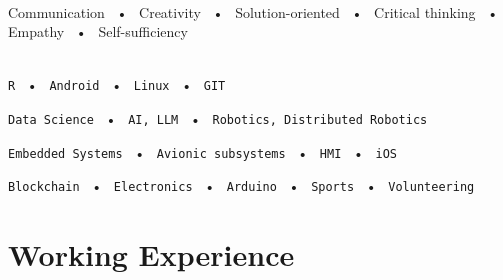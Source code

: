 \documentclass[lighthipster]{simplehipstercv}
\begin{document}
\begin{paracol}{2}
{    \bigskip
    
    \bigskip
    
    \\[0.5em]
    Communication ~•~ Creativity ~•~ Solution-oriented ~•~ Critical thinking ~•~ Empathy ~•~ Self-sufficiency

    \bigskip
    
    \\[0.5em]
    
    \texttt{R} ~•~ \texttt{Android} ~•~ \texttt{Linux} ~•~ \texttt{GIT}
    
    \texttt{Data Science} ~•~ \texttt{AI, LLM} ~•~ \texttt{Robotics, Distributed Robotics}
    
    \texttt{Embedded Systems} ~•~ \texttt{Avionic subsystems} ~•~ \texttt{HMI} ~•~ \texttt{iOS}

    \texttt{Blockchain} ~•~ \texttt{Electronics} ~•~ \texttt{Arduino} ~•~ \texttt{Sports} ~•~ \texttt{Volunteering} 
    
    \vspace{1em}
    
        
    
    }
    \switchcolumn %
    

    \section*{Working Experience}


\end{paracol}
\end{document}
